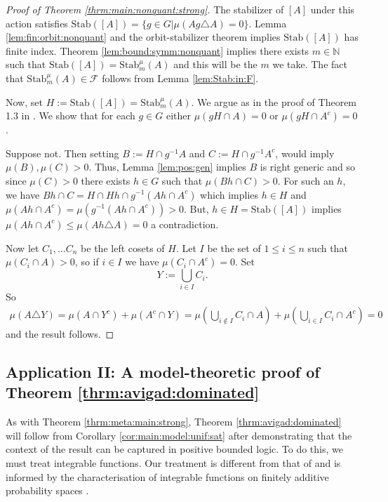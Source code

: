 \documentclass[11pt]{amsart}
\theoremstyle{definition}
\theoremstyle{remark}
\def\NN{\mathbb{N}}
\begin{document}
\begin{proof}[Proof of Theorem \ref{thrm:main:nonquant:strong}]
    The stabilizer of $[A]$ under this action satisfies $\mathrm{Stab}([A]) = \{g \in G| \mu(Ag \triangle A) =0\}$. Lemma \ref{lem:fin:orbit:nonquant} and the orbit-stabilizer theorem implies $\mathrm{Stab}([A])$ has finite index. Theorem \ref{lem:bound:symm:nonquant} implies there exists $m \in \NN$ such that $\mathrm{Stab}([A]) = \mathrm{Stab}_m^\mu(A)$ and this will be the $m$ we take. The fact that $\mathrm{Stab}_m^\mu(A) \in \mathcal{F}$ follows from Lemma \ref{lem:Stab:in:F}. 

    Now, set $H:= \mathrm{Stab}([A]) = \mathrm{Stab}_m^\mu(A)$. We argue as in the proof of Theorem 1.3 in \cite{conant2021quantitative}. We show that for each $g \in G$ either $\mu(gH \cap A) =0$ or $\mu(gH \cap A^c) =0$.
    
    Suppose not. Then setting $B:=H \cap g^{-1}A$ and $C:=H \cap g^{-1}A^c$, would imply $\mu(B), \mu(C) >0$. Thus, Lemma \ref{lem:pos:gen} implies $B$ is right generic and so since $\mu(C)>0$ there exists $h \in G$ such that $\mu(Bh \cap C)>0$. For such an $h$, we have $Bh \cap C = H \cap Hh \cap g^{-1}(Ah \cap A^c)$ which implies  $h \in H$ and $\mu(Ah \cap A^c)=\mu(g^{-1}(Ah \cap A^c))>0$. But, $h \in H=\mathrm{Stab}([A])$ implies $\mu(Ah \cap A^c) \le \mu(Ah \triangle A)=0$ a contradiction.

    Now let $C_1,\ldots C_n$ be the left cosets of $H$. Let $I$ be the set of $1 \le i \le n$ such that $\mu(C_i \cap A) >0$, so if $i \in I$ we have $\mu(C_i \cap A^c) = 0$. Set 
    \[
    Y:= \bigcup_{i\in I}C_i.
    \]
    So 
    \begin{equation*}
        \begin{aligned}
            \mu(A \triangle Y) = \mu(A \cap Y^c) + \mu(A^c \cap Y)
            =\mu\left(\bigcup_{i \notin I} C_i \cap A\right)+ \mu\left(\bigcup_{i \in I} C_i \cap A^c\right) =0
        \end{aligned}
    \end{equation*}
    and the result follows.
\end{proof}


\subsection{Application II: A model-theoretic proof of Theorem  \ref{thrm:avigad:dominated}}
\label{subsec:model:APP2}
As with Theorem  \ref{thrm:meta:main:strong}, Theorem \ref{thrm:avigad:dominated} will follow from Corollary \ref{cor:main:model:unif:sat} after demonstrating that the context of the result can be captured in positive bounded logic. To do this, we must treat integrable functions. Our treatment is different from that of \cite{DI2017} and is informed by the  characterisation of integrable functions on finitely additive probability spaces \cite{RR1983}.  
\end{document}
